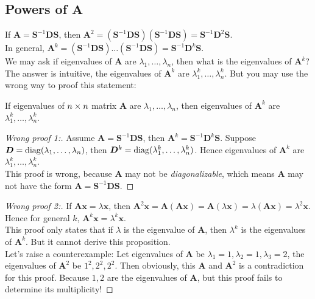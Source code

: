 \subsection[Powers of $A$]{Powers of $\bm A$}
If $\bm A=\bm S^{-1}\bm D\bm S$, then $\bm A^2=(\bm S^{-1}\bm D\bm S)(\bm S^{-1}\bm D\bm S)=\bm S^{-1}\bm D^2\bm S$.\\
In general, $\bm A^k=(\bm S^{-1}\bm D\bm S)\dots(\bm S^{-1}\bm D\bm S)=\bm S^{-1}\bm D^k\bm S$.\\
We may ask if eigenvalues of $\bm A$ are $\lambda_1,\dots,\lambda_n$, then what is the eigenvalues of $\bm A^k$? The answer is intuitive, the eigenvalues of $\bm A^k$ are $\lambda_1^k,\dots,\lambda_n^k$. But you may use the wrong way to proof this statement:
\begin{proposition}
If eigenvalues of $n\times n$ matrix $\bm A$ are $\lambda_1,\dots,\lambda_n$, then eigenvalues of $\bm A^{k}$ are $\lambda_1^k,\dots,\lambda_n^k$.
\end{proposition}
\begin{proof}[Wrong proof 1:]
Assume $\bm A=\bm S^{-1}\bm D\bm S$, then $\bm A^{k}=\bm S^{-1}\bm D^{k}\bm S$. Suppose $\bm D=\operatorname{diag}(\lambda_1,\dots,\lambda_n)$, then $\bm D^{k}=\operatorname{diag}(\lambda_1^k,\dots,\lambda_n^k)$. Hence eigenvalues of $\bm A^{k}$ are $\lambda_1^k,\dots,\lambda_n^k$.\\
This proof is wrong, because $\bm A$ may not be \textit{diagonalizable}, which means $\bm A$ may not have the form $\bm A=\bm S^{-1}\bm D\bm S$.
\end{proof}
\begin{proof}[Wrong proof 2:]
If $\bm{Ax}=\lambda\bm x$, then $\bm A^2\bm x=\bm A(\bm A\bm x)=\bm A(\lambda\bm x)=\lambda(\bm{Ax})=\lambda^2\bm x$.\\
Hence for general $k$, $\bm A^k\bm x=\lambda^k\bm x$.\\
This proof only states that if $\lambda$ is the eigenvalue of $\bm A$, then $\lambda^k$ is the eigenvalues of $\bm A^k$. But it cannot derive this proposition.\\ Let's raise a counterexample: Let eigenvalues of $\bm A$ be $\lambda_1=1,\lambda_2=1,\lambda_3=2$, the eigenvalues of $\bm A^2$ be $1^2,2^2,2^2$. Then obviously, this $\bm A$ and $\bm A^2$ is a contradiction for this proof. Because $1,2$ are the eigenvalues of $\bm A$, but this proof fails to determine its multiplicity!
\end{proof}

